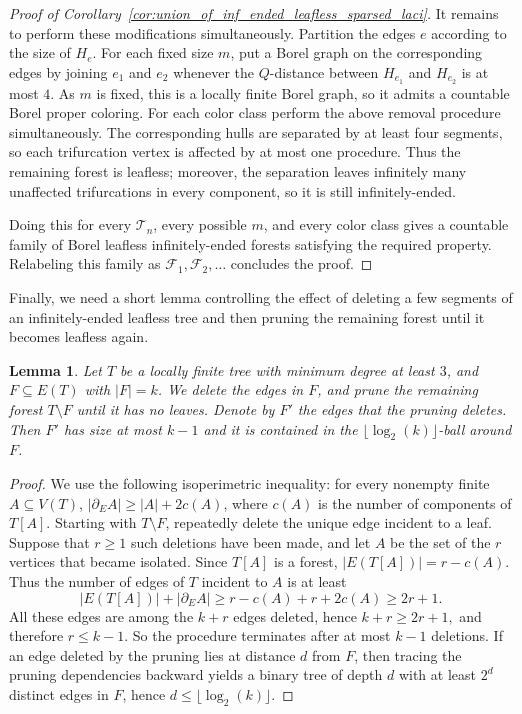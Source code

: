 \documentclass{article}
\theoremstyle{plain}
\newtheorem{lem}[thm]{Lemma}
\theoremstyle{definition}
\newcommand{\cF}{\mathcal{F}}
\newcommand{\cT}{\mathcal{T}}
\begin{document}
\begin{proof}[Proof of Corollary~\ref{cor:union_of_inf_ended_leafless_sparsed_laci}]
It remains to perform these modifications simultaneously. Partition the edges $e$ according to the size of $H_e$. For each fixed size $m$, put a Borel graph on the corresponding edges by joining $e_1$ and $e_2$ whenever the $Q$-distance between $H_{e_1}$ and $H_{e_2}$ is at most $4$. As $m$ is fixed, this is a locally finite Borel graph, so it admits a countable Borel proper coloring. For each color class perform the above removal procedure simultaneously. The corresponding hulls are separated by at least four segments, so each trifurcation vertex is affected by at most one procedure. Thus the remaining forest is leafless; moreover, the separation leaves infinitely many unaffected trifurcations in every component, so it is still infinitely-ended.

Doing this for every $\cT_n$, every possible $m$, and every color class gives a countable family of Borel leafless infinitely-ended forests satisfying the required property. Relabeling this family as $\cF_1,\cF_2,\dots$ concludes the proof.
\end{proof}

Finally, we need a short lemma controlling the effect of deleting a few segments of an infinitely-ended leafless tree and then pruning the remaining forest until it becomes leafless again. 

\begin{lem}\label{lem:pruning_tree_laci}
Let $T$ be a locally finite tree with minimum degree at least $3$, and $F \subseteq E(T)$ with $|F|=k$. We delete the edges in $F$, and prune the remaining forest $T \setminus F$ until it has no leaves. Denote by $F'$ the edges that the pruning deletes. Then
$F'$ has size at most $k-1$ and it is contained in the $\lfloor\log_2(k) \rfloor$-ball around $F$.
\end{lem}

\begin{proof}
We use the following isoperimetric inequality: for every nonempty finite \(A\subseteq V(T)\), $|\partial_E A|\geq |A|+2c(A)$, where \(c(A)\) is the number of components of \(T[A]\). Starting with \(T\setminus F\), repeatedly delete the unique edge incident to a leaf. Suppose that \(r\geq1\) such deletions have been made, and let \(A\) be the set of the \(r\) vertices that became isolated. Since \(T[A]\) is a forest, $|E(T[A])|=r-c(A)$. Thus the number of edges of \(T\) incident to \(A\) is at least 
\[
|E(T[A])|+|\partial_E A|\geq r-c(A)+r+2c(A)\geq 2r+1.
\]
All these edges are among the $k+r$ edges deleted, hence $k+r\geq2r+1,$ and therefore \(r\leq k-1\). So the procedure terminates after at most $k-1$ deletions. If an edge deleted by the pruning lies at distance $d$ from $F$, then tracing the pruning dependencies backward yields a binary tree of depth $d$ with at least $2^d$ distinct edges in $F$, hence $d \leq \lfloor\log_2(k) \rfloor$.
\end{proof}
\end{document}
